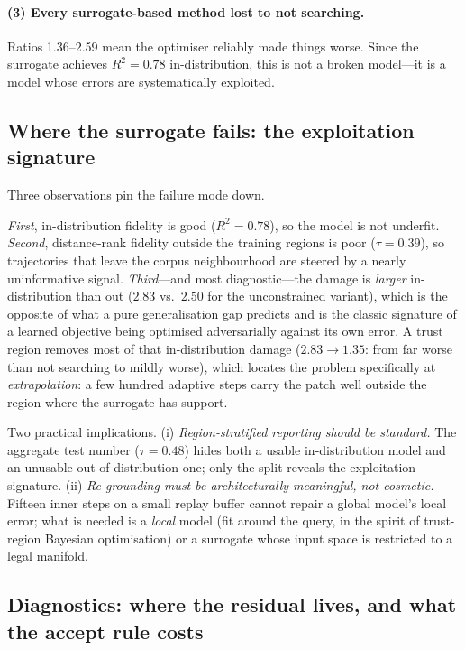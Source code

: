 \documentclass[11pt]{article}
\newcommand{\rGS}{2.59}
\newcommand{\rGST}{1.36}
\begin{document}
\paragraph{(3) Every surrogate-based method lost to not searching.}
Ratios \rGST--\rGS{} mean the optimiser reliably made things worse. Since the
surrogate achieves $R^2 = 0.78$ in-distribution, this is not a broken
model---it is a model whose errors are systematically exploited.

\subsection{Where the surrogate fails: the exploitation signature}\label{sec:res-surrogate}

Three observations pin the failure mode down.

\emph{First}, in-distribution fidelity is good ($R^2 = 0.78$), so the model is
not underfit. \emph{Second}, distance-rank fidelity outside the training regions
is poor ($\tau = 0.39$), so trajectories that leave the corpus neighbourhood are
steered by a nearly uninformative signal. \emph{Third}---and most
diagnostic---the damage is \emph{larger} in-distribution than out
($2.83$ vs.\ $2.50$ for the unconstrained variant), which is the opposite of what
a pure generalisation gap predicts and is the classic signature of a learned
objective being optimised adversarially against its own error. A trust region
removes most of that in-distribution damage ($2.83 \rightarrow 1.35$: from far
worse than not searching to mildly worse), which locates the problem
specifically at \emph{extrapolation}: a few hundred adaptive
steps carry the patch well outside the region where the surrogate has support.

Two practical implications. (i) \emph{Region-stratified reporting should be
standard.} The aggregate test number ($\tau = 0.48$) hides both a usable
in-distribution model and an unusable out-of-distribution one; only the split
reveals the exploitation signature. (ii) \emph{Re-grounding must be
architecturally meaningful, not cosmetic.} Fifteen inner steps on a small replay
buffer cannot repair a global model's local error; what is needed is a
\emph{local} model (fit around the query, in the spirit of trust-region Bayesian
optimisation) or a surrogate whose input space is restricted to a legal manifold.

\subsection{Diagnostics: where the residual lives, and what the accept rule costs}
\label{sec:res-diagnostics}
\end{document}
